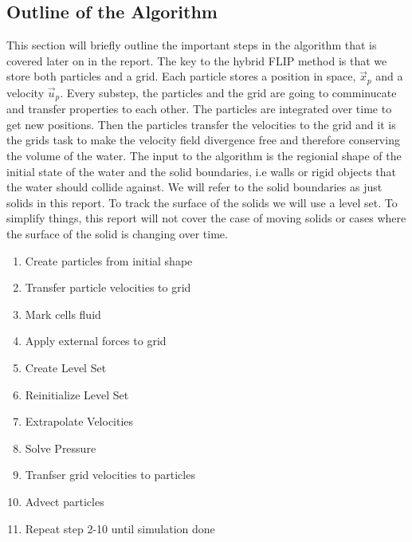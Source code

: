 \subsection{Outline of the Algorithm}

This section will briefly outline the important steps in the algorithm that is covered later on in the report. The key to the hybrid FLIP method is that we store both particles and a grid. Each particle stores a position in space, $\vec{x}_p$ and a velocity $\vec{u}_p$. Every substep, the particles and the grid are going to comminucate and transfer properties to each other. The particles are integrated over time to get new positions. Then the particles transfer the velocities to the grid and it is the grids task to make the velocity field divergence free and therefore conserving the volume of the water. The input to the algorithm is the regionial shape of the initial state of the water and the solid boundaries, i.e walls or rigid objects that the water should collide against. We will refer to the solid boundaries as just solids in this report. To track the surface of the solids we will use a level set. To simplify things, this report will not cover the case of moving solids or cases where the surface of the solid is changing over time.

\begin{enumerate}
\item Create particles from initial shape
\item Transfer particle velocities to grid
\item Mark cells fluid
\item Apply external forces to grid
\item Create Level Set
\item Reinitialize Level Set
\item Extrapolate Velocities
\item Solve Pressure
\item Tranfser grid velocities to particles
\item Advect particles
\item Repeat step 2-10 until simulation done
\end{enumerate}
